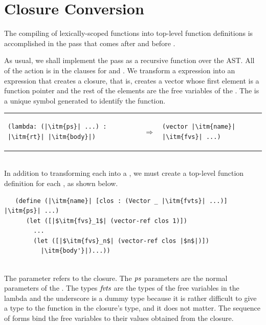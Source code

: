 \documentclass[11pt]{book}
\begin{document}
\section{Closure Conversion}

The compiling of lexically-scoped functions into top-level function
definitions is accomplished in the pass 
that comes after  and before
. 

As usual, we shall implement the pass as a recursive function over the
AST. All of the action is in the clauses for  and
. We transform a  expression into an expression
that creates a closure, that is, creates a vector whose first element
is a function pointer and the rest of the elements are the free
variables of the .  The  is a unique symbol
generated to identify the function.

\begin{tabular}{lll}
\begin{minipage}{0.4\textwidth}
\begin{lstlisting}
(lambda: (|\itm{ps}| ...) : |\itm{rt}| |\itm{body}|)
\end{lstlisting}
\end{minipage}
&
$\Rightarrow$
&
\begin{minipage}{0.4\textwidth}
\begin{lstlisting}
(vector |\itm{name}| |\itm{fvs}| ...)
\end{lstlisting}
\end{minipage}
\end{tabular}  \\
%
In addition to transforming each  into a , we
must create a top-level function definition for each , as
shown below.\\
\begin{minipage}{0.8\textwidth}
  \begin{lstlisting}
   (define (|\itm{name}| [clos : (Vector _ |\itm{fvts}| ...)] |\itm{ps}| ...)
      (let ([|$\itm{fvs}_1$| (vector-ref clos 1)])
        ...
        (let ([|$\itm{fvs}_n$| (vector-ref clos |$n$|)])
          |\itm{body'}|)...))
\end{lstlisting}
\end{minipage}\\
The  parameter refers to the closure. The $\mathit{ps}$
parameters are the normal parameters of the . The types
$\mathit{fvts}$ are the types of the free variables in the lambda and the
underscore is a dummy type because it is rather difficult to give a
type to the function in the closure's type, and it does not matter.
The sequence of  forms bind the free variables to their
values obtained from the closure.
\end{document}
